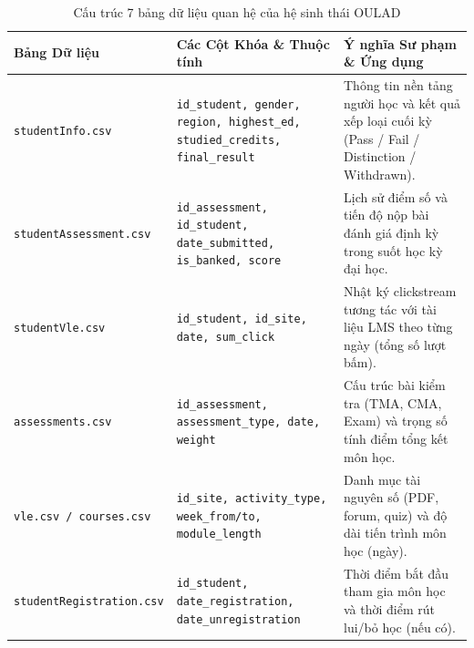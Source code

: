 \begin{table}[htbp]
  \centering\small
  \caption{Cấu trúc 7 bảng dữ liệu quan hệ của hệ sinh thái OULAD}\label{tab:oulad-schema}
  \begin{tabularx}{\textwidth}{p{3.5cm} p{3.2cm} X}
    \toprule
    \textbf{Bảng Dữ liệu} & \textbf{Các Cột Khóa \& Thuộc tính} & \textbf{Ý nghĩa Sư phạm \& Ứng dụng} \\
    \midrule
    \texttt{studentInfo.csv} & \texttt{id\_student, gender, region, highest\_ed, studied\_credits, final\_result} & Thông tin nền tảng người học và kết quả xếp loại cuối kỳ (Pass / Fail / Distinction / Withdrawn). \\
    \addlinespace
    \texttt{studentAssessment.csv} & \texttt{id\_assessment, id\_student, date\_submitted, is\_banked, score} & Lịch sử điểm số và tiến độ nộp bài đánh giá định kỳ trong suốt học kỳ đại học. \\
    \addlinespace
    \texttt{studentVle.csv} & \texttt{id\_student, id\_site, date, sum\_click} & Nhật ký clickstream tương tác với tài liệu LMS theo từng ngày (tổng số lượt bấm). \\
    \addlinespace
    \texttt{assessments.csv} & \texttt{id\_assessment, assessment\_type, date, weight} & Cấu trúc bài kiểm tra (TMA, CMA, Exam) và trọng số tính điểm tổng kết môn học. \\
    \addlinespace
    \texttt{vle.csv / courses.csv} & \texttt{id\_site, activity\_type, week\_from/to, module\_length} & Danh mục tài nguyên số (PDF, forum, quiz) và độ dài tiến trình môn học (ngày). \\
    \addlinespace
    \texttt{studentRegistration.csv} & \texttt{id\_student, date\_registration, date\_unregistration} & Thời điểm bắt đầu tham gia môn học và thời điểm rút lui/bỏ học (nếu có). \\
    \bottomrule
  \end{tabularx}
\end{table}

